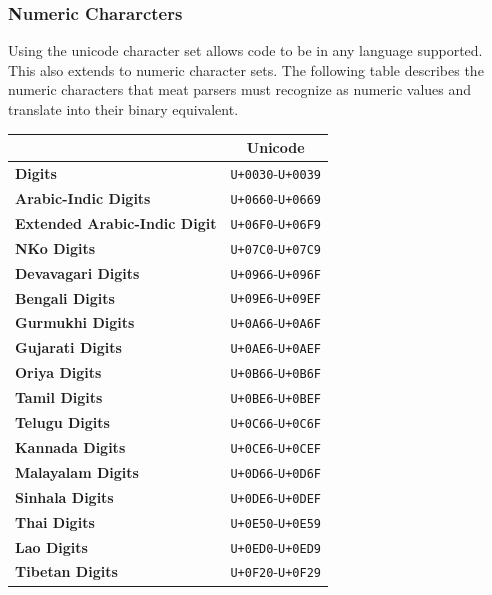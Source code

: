 \documentclass [10pt]{article}
\begin{document}
\subsubsection {Numeric Chararcters}

Using the unicode character set allows code to be in any language supported.
This also extends to numeric character sets. The following table describes the
numeric characters that meat parsers must recognize as numeric values and
translate into their binary equivalent.

\begin{center}
  \begin{tabular}{|l|c|}
    \hline
    & \textbf{Unicode} \\ \hline
    \textbf{Digits} & \texttt{U+0030}-\texttt{U+0039} \\ \hline
    \textbf{Arabic-Indic Digits} & \texttt{U+0660}-\texttt{U+0669} \\ \hline
    \textbf{Extended Arabic-Indic Digit}
    & \texttt{U+06F0}-\texttt{U+06F9} \\ \hline
    \textbf{NKo Digits} & \texttt{U+07C0}-\texttt{U+07C9} \\ \hline
    \textbf{Devavagari Digits} & \texttt{U+0966}-\texttt{U+096F} \\ \hline
    \textbf{Bengali Digits} & \texttt{U+09E6}-\texttt{U+09EF} \\ \hline
    \textbf{Gurmukhi Digits} & \texttt{U+0A66}-\texttt{U+0A6F} \\ \hline
    \textbf{Gujarati Digits} & \texttt{U+0AE6}-\texttt{U+0AEF} \\ \hline
    \textbf{Oriya Digits} & \texttt{U+0B66}-\texttt{U+0B6F} \\ \hline
    \textbf{Tamil Digits} & \texttt{U+0BE6}-\texttt{U+0BEF} \\ \hline
    \textbf{Telugu Digits} & \texttt{U+0C66}-\texttt{U+0C6F} \\ \hline
    \textbf{Kannada Digits} & \texttt{U+0CE6}-\texttt{U+0CEF} \\ \hline
    \textbf{Malayalam Digits} & \texttt{U+0D66}-\texttt{U+0D6F} \\ \hline
    \textbf{Sinhala Digits} & \texttt{U+0DE6}-\texttt{U+0DEF} \\ \hline
    \textbf{Thai Digits} & \texttt{U+0E50}-\texttt{U+0E59} \\ \hline
    \textbf{Lao Digits} & \texttt{U+0ED0}-\texttt{U+0ED9} \\ \hline
    \textbf{Tibetan Digits} & \texttt{U+0F20}-\texttt{U+0F29} \\ \hline
    \end{tabular}
\end{center}
\end{document}
